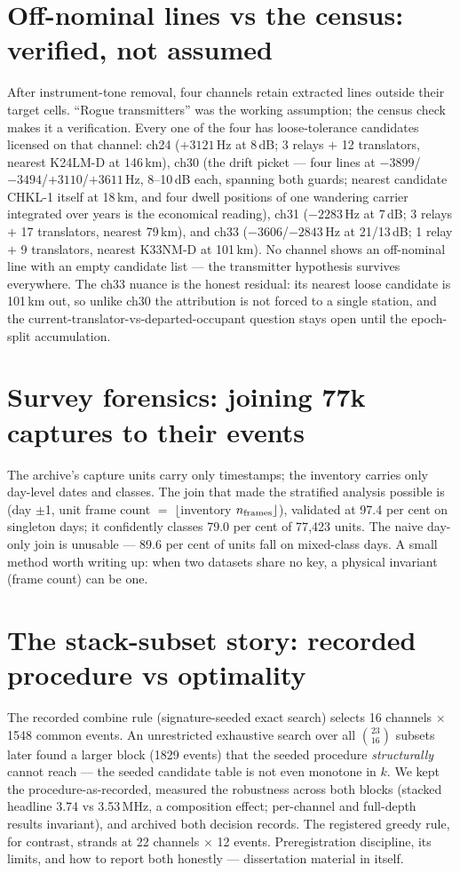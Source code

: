 \documentclass[10pt]{article}
\begin{document}
\section{Off-nominal lines vs the census: verified, not assumed}
After instrument-tone removal, four channels retain extracted lines
outside their target cells. ``Rogue transmitters'' was the working
assumption; the census check makes it a verification. Every one of
the four has loose-tolerance candidates licensed on that channel:
ch24 ($+3121$\,Hz at 8\,dB; 3 relays $+$ 12 translators, nearest
K24LM-D at 146\,km), ch30 (the drift picket --- four lines at
$-3899$/$-3494$/$+3110$/$+3611$\,Hz, 8--10\,dB each, spanning both
guards; nearest candidate CHKL-1 itself at 18\,km, and four dwell
positions of one wandering carrier integrated over years is the
economical reading), ch31 ($-2283$\,Hz at 7\,dB; 3 relays $+$ 17
translators, nearest 79\,km), and ch33 ($-3606$/$-2843$\,Hz at
21/13\,dB; 1 relay $+$ 9 translators, nearest K33NM-D at 101\,km).
No channel shows an off-nominal line with an empty candidate list ---
the transmitter hypothesis survives everywhere. The ch33 nuance is
the honest residual: its nearest loose candidate is 101\,km out, so
unlike ch30 the attribution is not forced to a single station, and
the current-translator-vs-departed-occupant question stays open until
the epoch-split accumulation.

\section{Survey forensics: joining 77k captures to their events}
The archive's capture units carry only timestamps; the inventory
carries only day-level dates and classes. The join that made the
stratified analysis possible is (day $\pm$1, unit frame count $=$
$\lfloor$inventory $n_{\rm frames}\rfloor$), validated at 97.4 per
cent on singleton days; it confidently classes 79.0 per cent of
77{,}423 units. The naive day-only join is unusable --- 89.6 per cent
of units fall on mixed-class days. A small method worth writing up:
when two datasets share no key, a physical invariant (frame count)
can be one.

\section{The stack-subset story: recorded procedure vs optimality}
The recorded combine rule (signature-seeded exact search) selects 16
channels $\times$ 1548 common events. An unrestricted exhaustive
search over all $\binom{23}{16}$ subsets later found a larger block
(1829 events) that the seeded procedure \emph{structurally} cannot
reach --- the seeded candidate table is not even monotone in $k$. We
kept the procedure-as-recorded, measured the robustness across both
blocks (stacked headline 3.74 vs 3.53\,MHz, a composition effect;
per-channel and full-depth results invariant), and archived both
decision records. The registered greedy rule, for contrast, strands
at 22 channels $\times$ 12 events. Preregistration discipline,
its limits, and how to report both honestly --- dissertation material
in itself.
\end{document}
